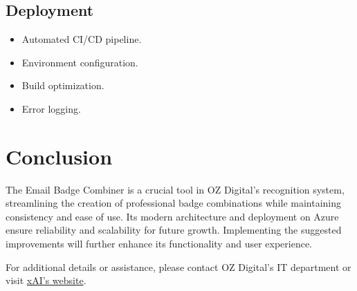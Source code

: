 \documentclass[12pt]{article}
\begin{document}
\subsection{Deployment}
\begin{itemize}
    \item Automated CI/CD pipeline.
    \item Environment configuration.
    \item Build optimization.
    \item Error logging.
\end{itemize}

\section{Conclusion}
The Email Badge Combiner is a crucial tool in OZ Digital's recognition system, streamlining the creation of professional badge combinations while maintaining consistency and ease of use. Its modern architecture and deployment on Azure ensure reliability and scalability for future growth. Implementing the suggested improvements will further enhance its functionality and user experience.

For additional details or assistance, please contact OZ Digital's IT department or visit \href{https://x.ai}{xAI's website}.
\end{document}
